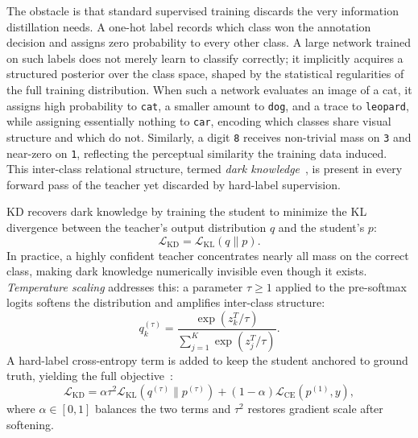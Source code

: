 \begin{foldable}
  The obstacle is that standard supervised training discards the very information distillation needs.
  A one-hot label records which class won the annotation decision and assigns zero probability to every other class.
  A large network trained on such labels does not merely learn to classify correctly; it implicitly acquires a structured posterior over the class space, shaped by the statistical regularities of the full training distribution.
  When such a network evaluates an image of a cat, it assigns high probability to \texttt{cat}, a smaller amount to \texttt{dog}, and a trace to \texttt{leopard}, while assigning essentially nothing to \texttt{car}, encoding which classes share visual structure and which do not.
  Similarly, a digit \texttt{8} receives non-trivial mass on \texttt{3} and near-zero on \texttt{1}, reflecting the perceptual similarity the training data induced.
  This inter-class relational structure, termed \textit{dark knowledge}~\cite{hinton2015distilling}, is present in every forward pass of the teacher yet discarded by hard-label supervision.
\end{foldable}

\begin{foldable}
  \Acl{KD} recovers dark knowledge by training the student to minimize the \ac{KL} divergence between the teacher's output distribution $q$ and the student's $p$:
  \begin{equation}
    \mathcal{L}_{\text{KD}} = \mathcal{L}_\text{KL}(q \| p).
    \label{eq:kd-loss-core}
  \end{equation}
  In practice, a highly confident teacher concentrates nearly all mass on the correct class, making dark knowledge numerically invisible even though it exists.
  \textit{Temperature scaling} addresses this: a parameter $\tau \geq 1$ applied to the pre-softmax logits softens the distribution and amplifies inter-class structure:
  \begin{equation}
    q_k^{(\tau)} = \frac{\exp(z_k^{T} / \tau)}{\sum_{j=1}^{K} \exp(z_j^{T} / \tau)}.
    \label{eq:softmax-temperature}
  \end{equation}
  A hard-label cross-entropy term is added to keep the student anchored to ground truth, yielding the full objective~\cite{hinton2015distilling}:
  \begin{equation}
    \mathcal{L}_{\text{KD}}
    = \alpha \tau^{2} \mathcal{L}_\text{KL}(q^{(\tau)} \| p^{(\tau)})
    + (1 - \alpha) \mathcal{L}_{\text{CE}}(p^{(1)}, y),
    \label{eq:kd-loss}
  \end{equation}
  where $\alpha \in [0,1]$ balances the two terms and $\tau^{2}$ restores gradient scale after softening.
\end{foldable}

